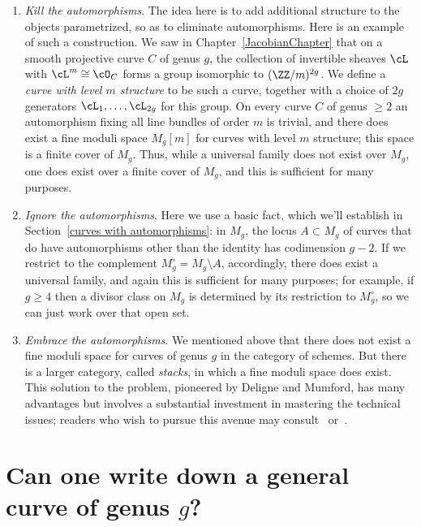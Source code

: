 \begin{enumerate}
\item \emph{Kill the automorphisms}. The idea here is to add additional structure to the objects parametrized, so as to eliminate automorphisms. Here is an example of such a construction. We saw in Chapter~\ref{JacobianChapter} that on a smooth projective curve $C$ of genus $g$, the collection of invertible sheaves $\cL$ with $\cL^m \cong \cO_C$ forms a group isomorphic to $(\ZZ/m)^{2g}$. We define a \emph{curve with level $m$ structure} to be such a curve, together with a choice of $2g$ generators $\cL_1,\dots,\cL_{2g}$ for this group. On every curve $C$ of genus $\geq 2$ an automorphism fixing all line bundles of order $m$ is trivial,  and there does 
exist a fine moduli space $M_g[m]$ for curves with level $m$ structure; this space is a finite cover of $M_g$. Thus, while a universal family does not exist over $M_g$, one does exist over a finite cover of $M_g$, and this is sufficient for many purposes.

\item \emph {Ignore the automorphisms}.
Here we use a basic fact, which we'll establish in Section~\ref{curves with automorphisms}: in $M_g$, the locus $A \subset M_g$ of curves that do have automorphisms other than the identity has codimension $g-2$. If we restrict to the complement $M_g^\circ = M_g \setminus A$, accordingly, there does exist a universal family, and again this is sufficient for many purposes; for example, if $g \geq 4$ then a divisor class on $M_g$ is determined by its restriction to $M_g^\circ$, so we can just work over that open set.

\item \emph{Embrace the automorphisms}. We mentioned above that there does not exist a fine moduli space for curves of genus $g$ in the category of schemes. But there is a larger category, called \emph{stacks}, in which a fine moduli space does exist. This solution to the problem, pioneered by Deligne and Mumford, has
many advantages but involves a substantial investment in mastering the technical issues; readers who wish to pursue this avenue may consult~\cite{Deligne-Mumford} or~\cite{Olsson}.
\end{enumerate} 


\section{Can one write down a general curve of genus $g$?}\label{mgunirational}

